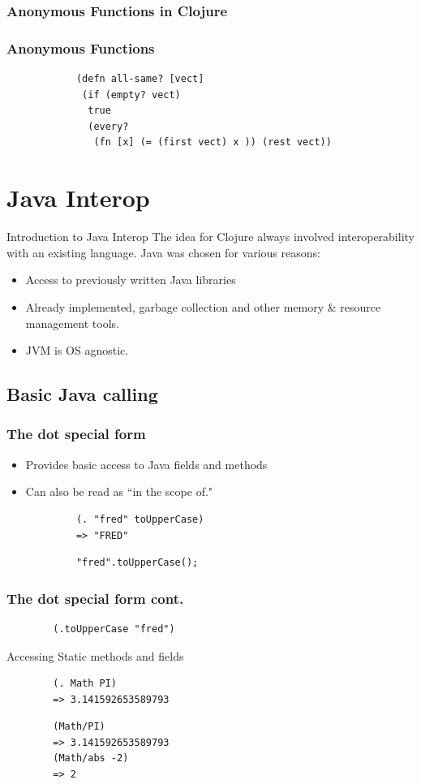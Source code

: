 \documentclass[xcolor=dvipsnames]{beamer}
\begin{document}
		\subsubsection{Anonymous Functions in Clojure}
		\begin{frame}[fragile]
		\frametitle{Anonymous Functions}
		\begin{verbatim}
			(defn all-same? [vect]
			 (if (empty? vect) 
			  true
			  (every? 
			   (fn [x] (= (first vect) x )) (rest vect))
		\end{verbatim}		
		\end{frame}
	\section{Java Interop}
		\begin{frame}{Introduction to Java Interop}
			The idea for Clojure always involved interoperability with an existing language. Java was chosen for various reasons:
			\begin{itemize}
				\item Access to previously written Java libraries
				\item Already implemented, garbage collection and other memory \& resource management tools.
				\item JVM is OS agnostic.
			\end{itemize}
		\end{frame}
		\subsection{Basic Java calling}
		
		\begin{frame}[fragile]
		\frametitle{The dot special form}
			\begin{itemize}
				\item Provides basic access to Java fields and methods
				\item Can also be read as ``in the scope of."
			\end{itemize}
			\begin{verbatim}
			(. "fred" toUpperCase)
			=> "FRED"
			\end{verbatim}
			\pause
			\begin{verbatim}
			"fred".toUpperCase();
			\end{verbatim}
		\end{frame}
		
		\begin{frame}[fragile]
		\frametitle{The dot special form cont.}
		\begin{verbatim}
		(.toUpperCase "fred")
		\end{verbatim}		
		\pause
		Accessing Static methods and fields
		\begin{verbatim}
		(. Math PI)
		=> 3.141592653589793
		\end{verbatim}		
		\begin{verbatim}
		(Math/PI)
		=> 3.141592653589793
		(Math/abs -2)
		=> 2
		\end{verbatim}		
		\end{frame}
		
\end{document}

